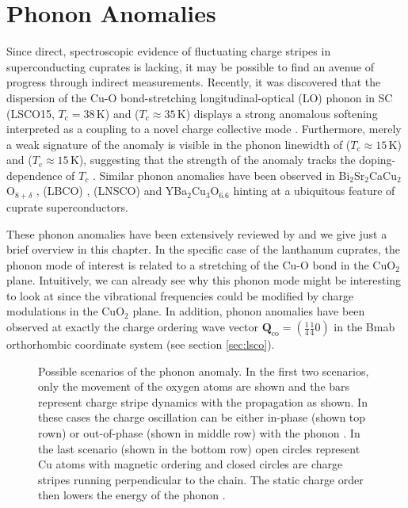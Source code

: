 \section{Phonon Anomalies}
Since direct, spectroscopic evidence of fluctuating charge stripes in superconducting cuprates is lacking, it may be possible to find an avenue of progress through indirect measurements. Recently, it was discovered that the dispersion of the Cu-O bond-stretching longitudinal-optical (LO) phonon in SC \LSCOopt{} (LSCO15, $T_\text{c} = 38\,\text{K}$) \cite{Reznik2007} and \LSCOTwenty{} ($T_\text{c} \approx 35\,\text{K}$) \cite{Park2014} displays a strong anomalous softening interpreted as a coupling to a novel charge collective mode \cite{Park2014}. Furthermore, merely a weak signature of the anomaly is visible in the phonon linewidth of \LSCOseven{} ($T_\text{c} \approx 15\,\text{K}$)  and \LSCOTwentyfive{} ($T_\text{c} \approx 15\,\text{K}$), suggesting that the strength of the anomaly tracks the doping-dependence of $T_c$ \cite{Park2014}. Similar phonon anomalies have been observed in Bi$_2$Sr$_2$CaCu$_2$O$_{8+\delta}$ \cite{Chaix2017}, \LBCOtwelve{} (LBCO) \cite{Reznik2006}, \LNSCO{} (LNSCO) \cite{Reznik2007} and YBa$_2$Cu$_3$O$_{6.6}$ \cite{LeTacon2014} hinting at a ubiquitous feature of cuprate superconductors.

These phonon anomalies have been extensively reviewed by \citeauthor{Reznik2012} \cite{Reznik2012} and we give just a brief overview in this chapter. In the specific case of the lanthanum cuprates, the phonon mode of interest is related to a stretching of the Cu-O bond in the CuO$_2$ plane. Intuitively, we can already see why this phonon mode might be interesting to look at since the vibrational frequencies could be modified by charge modulations in the CuO$_2$ plane. In addition, phonon anomalies have been observed at exactly the charge ordering wave vector $\bm{Q}_\text{co} = \left( \frac{1}{4} \frac{1}{4} 0 \right)$ in the Bmab orthorhombic coordinate system (see section \ref{sec:lsco}).

\begin{figure}
    \centering
    \caption[1D phonon anomaly sketch]{Possible scenarios of the phonon anomaly. In the first two scenarios, only the movement of the oxygen atoms are shown and the bars represent charge stripe dynamics with the propagation as shown. In these cases the charge oscillation can be either in-phase (shown top rown) or out-of-phase (shown in middle row) with the phonon \cite{Kaneshita2002}. In the last scenario (shown in the bottom row) open circles represent Cu atoms with magnetic ordering and closed circles are charge stripes running perpendicular to the chain. The static charge order then lowers the energy of the phonon \cite{Reznik2006}.}
    \label{fig:anomaly_1d}
\end{figure}

